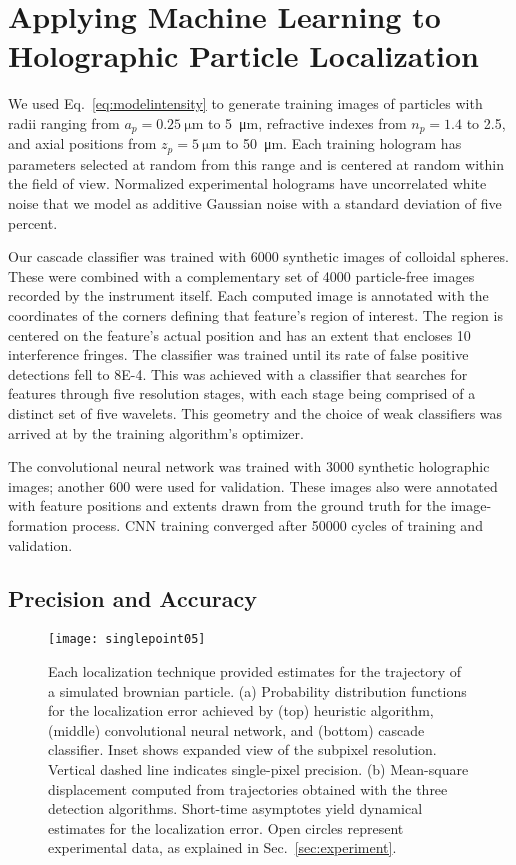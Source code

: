 \documentclass[10pt,letterpaper]{article}
\begin{document}
\section{Applying Machine Learning 
to Holographic Particle Localization}

We used Eq.~\eqref{eq:modelintensity} to generate training 
images of particles with radii ranging from 
$a_p = \SI{0.25}{\um}$ to \SI{5}{\um}, refractive indexes from 
$n_p = \num{1.4}$ to \num{2.5}, and axial positions from 
$z_p = \SI{5}{\um}$ to \SI{50}{\um}. 
Each training hologram has parameters selected at 
random from this 
range and is centered at random within
the field of view.
Normalized experimental holograms have uncorrelated white
noise that we model as additive Gaussian noise with a standard
deviation of five percent.

Our cascade classifier was trained with \num{6000}
synthetic images of colloidal spheres.
These were combined with a complementary set of 
\num{4000} particle-free images recorded by the instrument itself.
Each computed image is annotated with
the coordinates of the corners defining that feature's region of
interest.
The region is centered on the feature's actual position
and has an extent that encloses 10 interference fringes.
The classifier was trained
until its rate of false positive detections
fell to \num{8E-4}.
This was achieved with a classifier that searches for features
through five resolution stages, with each stage being
comprised of a distinct set of five wavelets.
This geometry and the choice of weak classifiers was arrived at
by the training algorithm's optimizer.

The convolutional neural network was trained with 
\num{3000} synthetic holographic images; another \num{600} 
were used for validation.
These images also were annotated with feature positions and extents
drawn from the ground truth for the image-formation process.
CNN training converged after \num{50000} cycles
of training and validation.

\subsection{Precision and Accuracy}
  
\begin{figure}[!t]
  \centering
  \texttt{[image: singlepoint05]}
  \caption{Each localization technique provided estimates
  for the trajectory of a simulated brownian particle.
  (a) Probability distribution functions for the
  localization error achieved by (top) heuristic
  algorithm, (middle) convolutional neural network,
  and (bottom) cascade classifier. 
  Inset shows expanded view of the subpixel
  resolution. Vertical dashed line indicates single-pixel
  precision.
  (b) Mean-square displacement computed from 
  trajectories obtained with the three detection algorithms.
  Short-time asymptotes yield dynamical estimates
  for the localization error.
  Open circles represent experimental data,
  as explained in Sec.~\ref{sec:experiment}.
  }
  \label{fig:msdplot}
\end{figure}
\end{document}
